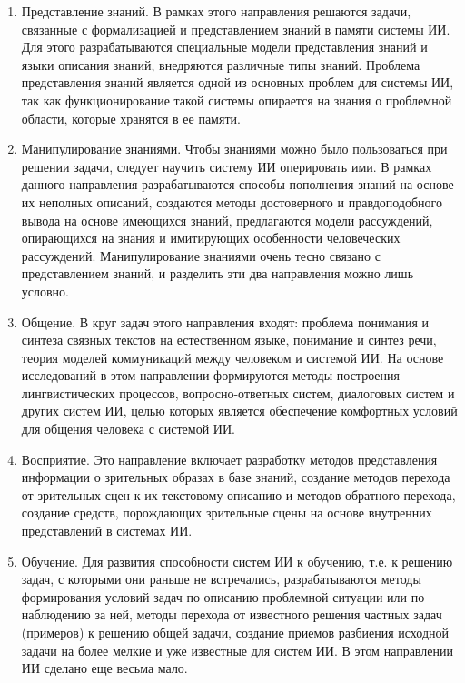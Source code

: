 \begin{enumerate}

\item{Представление знаний. В рамках этого направления решаются задачи, связанные с формализацией и представлением знаний в памяти системы ИИ. Для этого разрабатываются специальные модели представления знаний и языки описания знаний, внедряются различные типы знаний. Проблема представления знаний является одной из основных проблем для системы ИИ, так как функционирование такой системы опирается на знания о проблемной области, которые хранятся в ее памяти.}

\item{Манипулирование знаниями. Чтобы знаниями можно было пользоваться при решении задачи, следует научить систему ИИ оперировать ими. В рамках данного направления разрабатываются способы пополнения знаний на основе их неполных описаний, создаются методы достоверного и правдоподобного вывода на основе имеющихся знаний, предлагаются модели рассуждений, опирающихся на знания и имитирующих особенности человеческих рассуждений. Манипулирование знаниями очень тесно связано с представлением знаний, и разделить эти два направления можно лишь условно.}

\item{Общение. В круг задач этого направления входят: проблема понимания и синтеза связных текстов на естественном языке, понимание и синтез речи, теория моделей коммуникаций между человеком и системой ИИ. На основе исследований в этом направлении формируются методы построения лингвистических процессов, вопросно-ответных систем, диалоговых систем и других систем ИИ, целью которых является обеспечение комфортных условий для общения человека с системой ИИ.}

\item{Восприятие. Это направление включает разработку методов представления информации о зрительных образах в базе знаний, создание методов перехода от зрительных сцен к их текстовому описанию и методов обратного перехода, создание средств, порождающих зрительные сцены на основе внутренних представлений в системах ИИ.}

\item{Обучение. Для развития способности систем ИИ к обучению, т.е. к решению задач, с которыми они раньше не встречались, разрабатываются методы формирования условий задач по описанию проблемной ситуации или по наблюдению за ней, методы перехода от известного решения частных задач (примеров) к решению общей задачи, создание приемов разбиения исходной задачи на более мелкие и уже известные для систем ИИ. В этом направлении ИИ сделано еще весьма мало.}


\end{enumerate}
